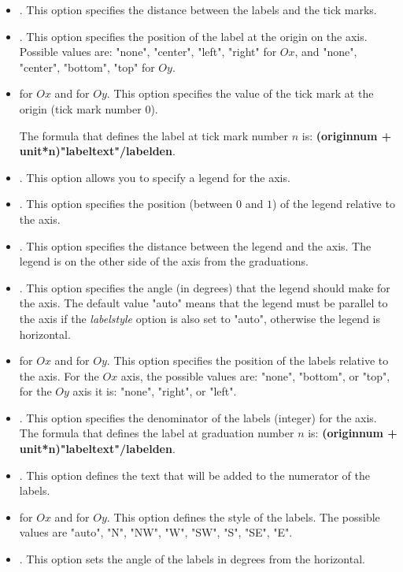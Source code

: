 \begin{itemize}
\begin{itemize}
    \item {}. This option specifies the distance between the labels and the tick marks.
    \item {}. This option specifies the position of the label at the origin on the axis. Possible values ​​are: "none", "center", "left", "right" for $Ox$, and "none", "center", "bottom", "top" for $Oy$.
    \item {} for $Ox$ and  for $Oy$. This option specifies the value of the tick mark at the origin (tick mark number $0$).

The formula that defines the label at tick mark number $n$ is: \textbf{(originnum + unit*n)"labeltext"/labelden}.

    \item {}. This option allows you to specify a legend for the axis.
    \item {}. This option specifies the position (between $0$ and $1$) of the legend relative to the axis.
    \item {}. This option specifies the distance between the legend and the axis. The legend is on the other side of the axis from the graduations.
    \item {}. This option specifies the angle (in degrees) that the legend should make for the axis. The default value "auto" means that the legend must be parallel to the axis if the \emph{labelstyle} option is also set to "auto", otherwise the legend is horizontal.
    \item {} for $Ox$ and  for $Oy$. This option specifies the position of the labels relative to the axis. For the $Ox$ axis, the possible values ​​are: "none", "bottom", or "top", for the $Oy$ axis it is: "none", "right", or "left".
    \item {}. This option specifies the denominator of the labels (integer) for the axis. The formula that defines the label at graduation number $n$ is: \textbf{(originnum + unit*n)"labeltext"/labelden}.
    \item {}. This option defines the text that will be added to the numerator of the labels.
    \item {} for $Ox$ and  for $Oy$. This option defines the style of the labels. The possible values ​​are "auto", "N", "NW", "W", "SW", "S", "SE", "E".
    \item {}. This option sets the angle of the labels in degrees from the horizontal.

\end{itemize}
\end{itemize}
